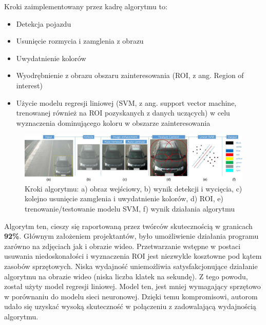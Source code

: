 Kroki zaimplementowany przez kadrę algorytmu to:
\begin{itemize}
    \item Detekcja pojazdu
    \item Usunięcie rozmycia i zamglenia z obrazu
    \item Uwydatnienie kolorów
    \item Wyodrębnienie z obrazu obszaru zainteresowania (ROI, z ang. Region of interest)
    \item Użycie modelu regresji liniowej (SVM, z ang. support vector machine, trenowanej również na ROI pozyskanych z danych uczących) w celu wyznaczenia dominującego koloru w obszarze zainteresowania
\end{itemize}

\begin{figure}[h!]
    \begin{center}
        \includegraphics[scale=0.48]{img/chen.png}
    \end{center}
    \caption{Kroki algorytmu: a) obraz wejściowy, b) wynik detekcji i wycięcia, c) kolejno usunięcie zamglenia i uwydatnienie kolorów, d) ROI, e) trenowanie/testowanie modelu SVM, f) wynik działania algorytmu}
    \label{fig:chen_algo}
\end{figure}

Algorytm ten, cieszy się raportowaną przez twórców skutecznością w granicach \textbf{92\%}. Głównym założeniem projektantów, było umożliwienie działania programu zarówno na zdjęciach jak i obrazie wideo. Przetwarzanie wstępne w postaci usuwania niedoskonałości i wyznaczenia ROI jest niezwykle kosztowne pod kątem zasobów sprzętowych. Niska wydajność uniemożliwia satysfakcjonujące działanie algorytmu na obrazie wideo (niska liczba klatek na sekundę). Z tego powodu, został użyty model regresji liniowej. Model ten, jest mniej wymagający sprzętowo w porównaniu do modelu sieci neuronowej. Dzięki temu kompromisowi, autorom udało się uzyskać wysoką skuteczność w połączeniu z zadowalającą wydajnością algorytmu.

